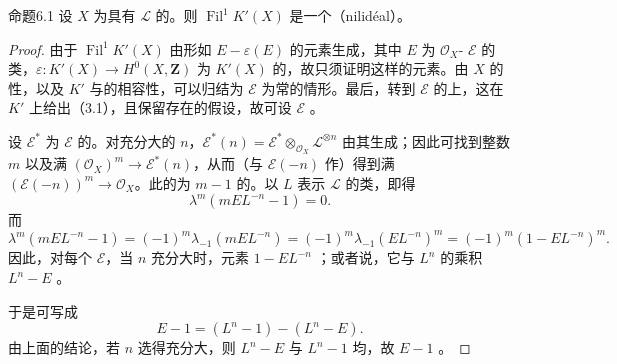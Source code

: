\begin{SGAresult}{命题}{6.1}
设 $X$ 为具有 $\mathcal L$ 的。则 $\operatorname{Fil}^1K'(X)$ 是一个（nilidéal）。
\end{SGAresult}
\begin{proof}
由于 $\operatorname{Fil}^1K'(X)$ 由形如 $E-\varepsilon(E)$ 的元素生成，其中 $E$ 为 $\mathcal O_X$- $\mathcal E$ 的类，$\varepsilon\colon K'(X)\longrightarrow H^0(X,\mathbf Z)$ 为 $K'(X)$ 的，故只须证明这样的元素。由 $X$ 的性，以及 $K'$ 与的相容性，可以归结为 $\mathcal E$ 为常的情形。最后，转到 $\mathcal E$ 的上，这在 $K'$ 上给出（3.1），且保留存在的假设，故可设 $\mathcal E$ 。

设 $\mathcal E^*$ 为 $\mathcal E$ 的。对充分大的 $n$，$\mathcal E^*(n)=\mathcal E^*\otimes_{\mathcal O_X}\mathcal L^{\otimes n}$ 由其生成；因此可找到整数 $m$ 以及满 $(\mathcal O_X)^m\longrightarrow\mathcal E^*(n)$，从而（与 $\mathcal E(-n)$ 作）得到满 $(\mathcal E(-n))^m\longrightarrow\mathcal O_X$。此的为 $m-1$ 的。以 $L$ 表示 $\mathcal L$ 的类，即得
\[
\lambda^m(mEL^{-n}-1)=0.
\]
而
\[
\lambda^m(mEL^{-n}-1)=(-1)^m\lambda_{-1}(mEL^{-n})
=(-1)^m\lambda_{-1}(EL^{-n})^m=(-1)^m(1-EL^{-n})^m.
\]
因此，对每个 $\mathcal E$，当 $n$ 充分大时，元素 $1-EL^{-n}$ ；或者说，它与 $L^n$ 的乘积 $L^n-E$ 。

于是可写成
\[
E-1=(L^n-1)-(L^n-E).
\]
由上面的结论，若 $n$ 选得充分大，则 $L^n-E$ 与 $L^n-1$ 均，故 $E-1$ 。
\end{proof}

